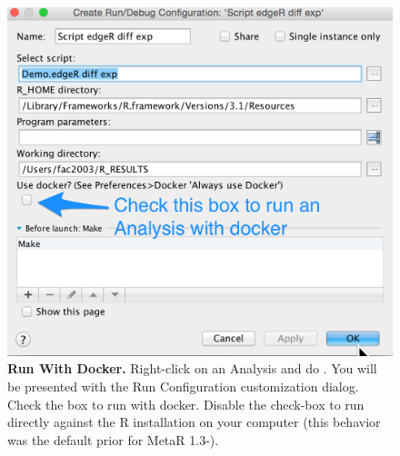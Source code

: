 \begin{figure}
  \centering
  \includegraphics[width=\figWidthNarrow]{figures/CheckThisBoxToRunWithDocker.png}
\caption[Run With Docker.]{\textbf{Run With Docker.} Right-click on an Analysis and do . You will be presented with the Run Configuration customization dialog. Check the box to run with docker. Disable the check-box to run directly against the R installation on your computer (this behavior was the default prior for MetaR 1.3-).  }
\label{fig:RunWithDocker}
\end{figure}


